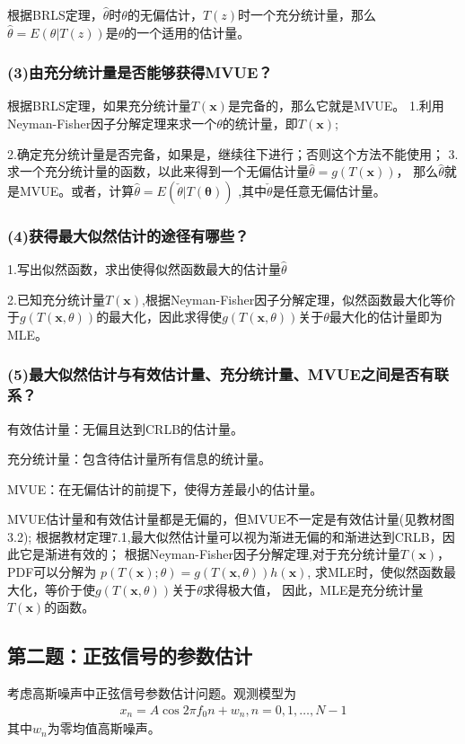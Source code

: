 \documentclass[fontset=windows]{article}
\numberwithin{figure}{section}
\begin{document}
根据BRLS定理，\(\hat{\theta}\)时\(\theta\)的无偏估计，\(T(z)\)时一个充分统计量，那么\(\hat{\theta}=E(\theta|T(z))\)是\(\theta\)的一个适用的估计量。

\subsubsection*{(3)由充分统计量是否能够获得MVUE？}
根据BRLS定理，如果充分统计量\(T(\mathbf{x})\)是完备的，那么它就是MVUE。
1.利用Neyman-Fisher因子分解定理来求一个\(\theta\)的统计量，即\(T(\mathbf{x})\);

2.确定充分统计量是否完备，如果是，继续往下进行；否则这个方法不能使用；
3.求一个充分统计量的函数，以此来得到一个无偏估计量\(\hat{\theta}=g(T(\mathbf{x}))\)，
那么\(\hat{\theta}\)就是MVUE。或者，计算\(\hat{\theta}=E(\check{\theta}|T(\mathbf{\theta}))\)
,其中\(\check{\theta}\)是任意无偏估计量。

\subsubsection*{(4)获得最大似然估计的途径有哪些？}
1.写出似然函数，求出使得似然函数最大的估计量\(\hat{\theta}\)

2.已知充分统计量\(T(\mathbf{x})\),根据Neyman-Fisher因子分解定理，似然函数最大化等价于\(g(T(\mathbf{x},\theta))\)的最大化，因此求得使\(g(T(\mathbf{x},\theta))\)关于\(\theta\)最大化的估计量即为MLE。

\subsubsection*{(5)最大似然估计与有效估计量、充分统计量、MVUE之间是否有联系？}
有效估计量：无偏且达到CRLB的估计量。

充分统计量：包含待估计量所有信息的统计量。

MVUE：在无偏估计的前提下，使得方差最小的估计量。

MVUE估计量和有效估计量都是无偏的，但MVUE不一定是有效估计量(见教材图3.2);
根据教材定理7.1,最大似然估计量可以视为渐进无偏的和渐进达到CRLB，因此它是渐进有效的；
根据Neyman-Fisher因子分解定理,对于充分统计量\(T(\mathbf{x})\)，PDF可以分解为
\(p(T(\mathbf{x});\theta)=g(T(\mathbf{x},\theta))h(\mathbf{x})\),
求MLE时，使似然函数最大化，等价于使\(g(T(\mathbf{x},\theta))\)关于\(\theta\)求得极大值，
因此，MLE是充分统计量\(T(\mathbf{x})\)的函数。

\subsection{第二题：正弦信号的参数估计}
考虑高斯噪声中正弦信号参数估计问题。观测模型为
\begin{align*}
	x_n=A\cos2\pi f_0 n+w_n,n=0,1,…,N-1
\end{align*}
其中\(w_n\)为零均值高斯噪声。
\end{document}
